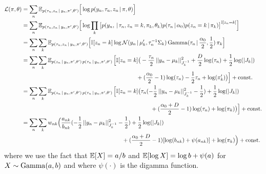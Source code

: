 \begin{enumerate}[label=(\alph*)]
\begin{solution}
\begin{align*}
    \cL(\pi, \theta)
        &= \sum_n \E_{p(\tau_n, z_n \given y_n, \pi', \theta')}
            \Big[ \log p(y_n, \tau_n, z_n \given \pi, \theta)\Big] \\
        &= \sum_n \E_{p(\tau_n, z_n \given y_n, \pi', \theta')}
            \Big[ \log \prod_k \big[ 
                p(y_n, \given \tau_n, z_n=k, \pi_k, \theta_k)
                p(\tau_n \given \alpha_0)
                p(z_n =k \given \pi_k)
                \big]^{\bbI[z_n = k]}
            \Big] \\
        &= \sum_n \sum_k \E_{p(\tau_n, z_n \given y_n, \pi', \theta')}
            \Big[\bbI[z_n = k] \log
                \distNormal(y_n \given \mu_k', \tau_n^{-1}\Sigma_k) \,
                \distGamma(\tau_n \given \frac{\alpha_0}{2}, \frac{1}{2}) \,
                \pi_k
            \Big] \\
        &= \sum_n \sum_k \E_{p(z_n \given y_n, \pi', \theta')\,
                            p(\tau_n \given y_n, \pi', \theta')\,}
            \Big[\bbI[z_n = k] \big(
                -\frac{\tau_n}{2}\, ||y_n - \mu_k||^2_{J_k^{-1}}
                +\frac{D}{2}\log(\tau_n) + \frac{1}{2} \log(|J_k|) \\
        &\hspace{200pt}
                + (\frac{\alpha_0}{2}-1) \log(\tau_n) - \frac{1}{2} \tau_n
                + \log(\pi_k')
            \big) \Big] +\textrm{const.}\\
        &= \sum_n \sum_k \E_{p(z_n \given y_n, \pi', \theta')\,
                            p(\tau_n \given y_n, \pi', \theta')\,}
            \Big[\bbI[z_n = k] \big(
                \tau_n(-\frac{1}{2}\, ||y_n - \mu_k||^2_{J_k^{-1}}
                    -\frac{1}{2})
                + \frac{1}{2} \log(|J_k|) \\
        &\hspace{225pt}
                + (\frac{\alpha_0+D}{2}-1) \log(\tau_n)
                + \log(\pi_k)
            \big) \Big] +\textrm{const.}\\
        &= \sum_n \sum_k w_{nk} \Big(
                \frac{a_{nk}}{b_{nk}}(-\frac{1}{2}\, ||y_n - \mu_k||^2_{J_k^{-1}}
                    -\frac{1}{2})
                + \frac{1}{2} \log(|J_k|) \\
            &\hspace{175pt}
                + (\frac{\alpha_0+D}{2}-1)[\log(b_{nk}) + \psi(a_{nk})]
                + \log(\pi_k)
            \Big) +\textrm{const.}\\
\end{align*}
where we use the fact that
$\mathbb{E}[X] = a/b$ and
$\mathbb{E}[\log X] = \log b + \psi(a)$
for $X \sim\mathrm{Gamma}(a,b)$ and where $\psi(\cdot)$ is the digamma function.


\end{solution}
\end{enumerate}
